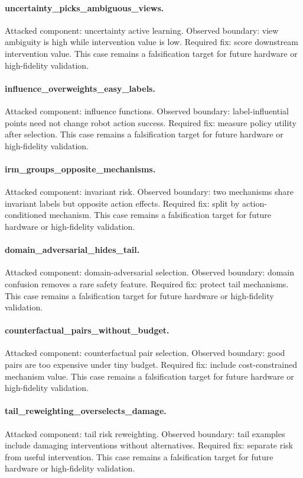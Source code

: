 \documentclass{article}
\begin{document}
\paragraph{uncertainty\_picks\_ambiguous\_views.} Attacked component: uncertainty active learning. Observed boundary: view ambiguity is high while intervention value is low. Required fix: score downstream intervention value. This case remains a falsification target for future hardware or high-fidelity validation.
\paragraph{influence\_overweights\_easy\_labels.} Attacked component: influence functions. Observed boundary: label-influential points need not change robot action success. Required fix: measure policy utility after selection. This case remains a falsification target for future hardware or high-fidelity validation.
\paragraph{irm\_groups\_opposite\_mechanisms.} Attacked component: invariant risk. Observed boundary: two mechanisms share invariant labels but opposite action effects. Required fix: split by action-conditioned mechanism. This case remains a falsification target for future hardware or high-fidelity validation.
\paragraph{domain\_adversarial\_hides\_tail.} Attacked component: domain-adversarial selection. Observed boundary: domain confusion removes a rare safety feature. Required fix: protect tail mechanisms. This case remains a falsification target for future hardware or high-fidelity validation.
\paragraph{counterfactual\_pairs\_without\_budget.} Attacked component: counterfactual pair selection. Observed boundary: good pairs are too expensive under tiny budget. Required fix: include cost-constrained mechanism value. This case remains a falsification target for future hardware or high-fidelity validation.
\paragraph{tail\_reweighting\_overselects\_damage.} Attacked component: tail risk reweighting. Observed boundary: tail examples include damaging interventions without alternatives. Required fix: separate risk from useful intervention. This case remains a falsification target for future hardware or high-fidelity validation.
\end{document}
